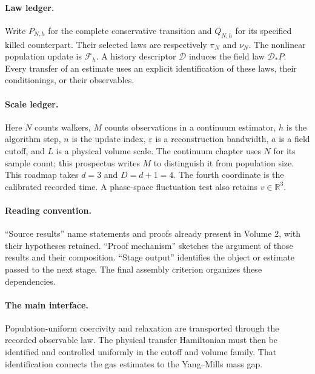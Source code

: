 \documentclass[11pt,a4paper]{article}
\begin{document}
\paragraph{Law ledger.} Write \(P_{N,h}\) for the complete conservative transition and \(Q_{N,h}\) for its specified killed counterpart. Their selected laws are respectively \(\pi_N\) and \(\nu_N\). The nonlinear population update is \(\mathcal F_h\). A history descriptor \(\mathscr D\) induces the field law \(\mathscr D_*P\). Every transfer of an estimate uses an explicit identification of these laws, their conditionings, or their observables.
\paragraph{Scale ledger.} Here \(N\) counts walkers, \(M\) counts observations in a continuum estimator, \(h\) is the algorithm step, \(n\) is the update index, \(\varepsilon\) is a reconstruction bandwidth, \(a\) is a field cutoff, and \(L\) is a physical volume scale. The continuum chapter uses \(N\) for its sample count; this prospectus writes \(M\) to distinguish it from population size. This roadmap takes \(d=3\) and \(D=d+1=4\). The fourth coordinate is the calibrated recorded time. A phase-space fluctuation test also retains \(v\in\mathbb R^3\).
\paragraph{Reading convention.} ``Source results'' name statements and proofs already present in Volume 2, with their hypotheses retained. ``Proof mechanism'' sketches the argument of those results and their composition. ``Stage output'' identifies the object or estimate passed to the next stage. The final assembly criterion organizes these dependencies.
\paragraph{The main interface.} Population-uniform coercivity and relaxation are transported through the recorded observable law. The physical transfer Hamiltonian must then be identified and controlled uniformly in the cutoff and volume family. That identification connects the gas estimates to the Yang--Mills mass gap.
\end{document}
